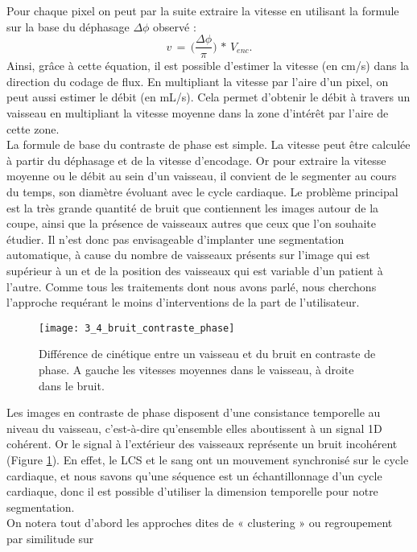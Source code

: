 Pour chaque pixel on peut par la suite extraire la vitesse en utilisant la formule sur la base du
déphasage $\Delta \phi$ observé :
\begin{equation}
v\,=\,\biggl(\frac{\Delta\phi}{\pi}\biggr)\,*\,V_{enc}.
\end{equation}
Ainsi, grâce à cette équation, il est possible d’estimer la vitesse (en cm/s) dans la direction du codage
de flux. En multipliant la vitesse par l’aire d’un pixel, on peut aussi estimer le débit (en mL/s). Cela
permet d’obtenir le débit à travers un vaisseau en multipliant la vitesse moyenne dans la zone d’intérêt
par l’aire de cette zone.\\
La formule de base du contraste de phase est simple. La vitesse peut être calculée à partir du
déphasage et de la vitesse d’encodage. Or pour extraire la vitesse moyenne ou le débit au sein d’un
vaisseau, il convient de le segmenter au cours du temps, son diamètre évoluant avec le cycle cardiaque.
Le problème principal est la très grande quantité de bruit que contiennent les images autour de la
coupe, ainsi que la présence de vaisseaux autres que ceux que l’on souhaite étudier. Il n’est donc pas
envisageable d’implanter une segmentation automatique, à cause du nombre de vaisseaux présents
sur l’image qui est supérieur à un et de la position des vaisseaux qui est variable d’un patient à l’autre.
Comme tous les traitements dont nous avons parlé, nous cherchons l’approche requérant le moins
d’interventions de la part de l’utilisateur.\\
\begin{figure}[!t]
\centering
\texttt{[image: 3\_4\_bruit\_contraste\_phase]}
\caption{Différence de cinétique entre un vaisseau et du bruit en contraste de phase. A gauche les vitesses moyennes dans
le vaisseau, à droite dans le bruit.}
\label{fig:3_4_bruit_contraste_phase}	
\end{figure}
Les images en contraste de phase disposent d’une consistance temporelle au niveau du vaisseau,
c’est-à-dire qu’ensemble elles aboutissent à un signal 1D cohérent. Or le signal à l’extérieur des
vaisseaux représente un bruit incohérent (Figure \ref{fig:3_4_bruit_contraste_phase}). En effet, le LCS et le sang ont un mouvement
synchronisé sur le cycle cardiaque, et nous savons qu’une séquence est un échantillonnage d’un cycle
cardiaque, donc il est possible d’utiliser la dimension temporelle pour notre segmentation.\\
On notera tout d’abord les approches dites de « clustering » ou regroupement par similitude sur
